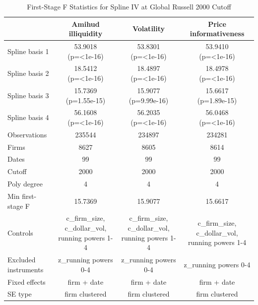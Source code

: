 \begin{table}[!htbp]\centering
\caption{First-Stage F Statistics for Spline IV at Global Russell 2000 Cutoff}
\label{tab:iv_spline_global_first_stage}
\begin{threeparttable}
\footnotesize
\setlength{\tabcolsep}{3.5pt}
\renewcommand{\arraystretch}{1.05}
\begin{tabular}{lccc}
\toprule
 & Amihud illiquidity & Volatility & Price informativeness \\
\midrule
Spline basis 1 & \shortstack{53.9018\\(p=<1e-16)} & \shortstack{53.8301\\(p=<1e-16)} & \shortstack{53.9410\\(p=<1e-16)} \\
Spline basis 2 & \shortstack{18.5412\\(p=<1e-16)} & \shortstack{18.4897\\(p=<1e-16)} & \shortstack{18.4978\\(p=<1e-16)} \\
Spline basis 3 & \shortstack{15.7369\\(p=1.55e-15)} & \shortstack{15.9077\\(p=9.99e-16)} & \shortstack{15.6617\\(p=1.89e-15)} \\
Spline basis 4 & \shortstack{56.1608\\(p=<1e-16)} & \shortstack{56.2035\\(p=<1e-16)} & \shortstack{56.0468\\(p=<1e-16)} \\
\midrule
Observations & 235544 & 234897 & 234281 \\
Firms & 8627 & 8605 & 8614 \\
Dates & 99 & 99 & 99 \\
Cutoff & 2000 & 2000 & 2000 \\
Poly degree & 4 & 4 & 4 \\
Min first-stage F & 15.7369 & 15.9077 & 15.6617 \\
Controls & c_firm_size, c_dollar_vol, running powers 1-4 & c_firm_size, c_dollar_vol, running powers 1-4 & c_firm_size, c_dollar_vol, running powers 1-4 \\
Excluded instruments & z_running powers 0-4 & z_running powers 0-4 & z_running powers 0-4 \\
Fixed effects & firm + date & firm + date & firm + date \\
SE type & firm clustered & firm clustered & firm clustered \\

\end{tabular}
\end{threeparttable}
\end{table}
